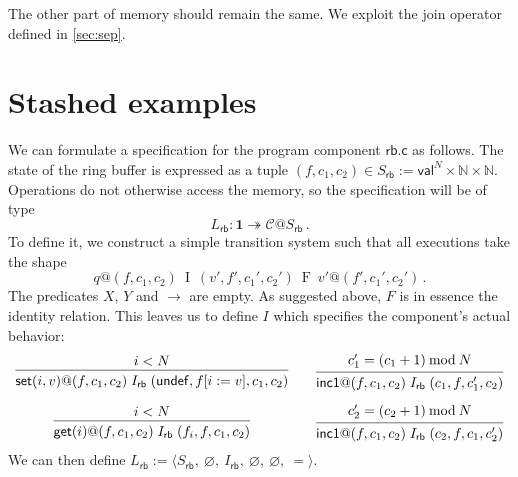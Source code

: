 \documentclass[acmsmall,screen,review,anonymous]{acmart}
\newcommand{\kw}[1]{\ensuremath{ \mathsf{#1} }}
\begin{document}
The other part of memory should remain the same.
We exploit the join operator defined in \ref{sec:sep}.

\section{Stashed examples}

\begin{example} \label{ex:rbspec} %
We can formulate a specification for
the program component $\kw{rb.c}$ as follows.
The state of the ring buffer
is expressed as a tuple
$(f, c_1, c_2) \in S_\kw{rb} := \kw{val}^N \times \mathbb{N} \times \mathbb{N}$.
Operations do not otherwise access the memory,
so the specification will be of type
\[
  L_\kw{rb} : \mathbf{1} \twoheadrightarrow \mathcal{C}@S_\kw{rb}
  \,.
\]
To define it, we construct a simple transition system such that
all executions take the shape
\[
  q@(f, c_1, c_2) \:\mathrel{I}\: (v', f', c_1', c_2')
                  \:\mathrel{F}\: v'@(f', c_1', c_2')
  \,.
\]
The predicates $X$, $Y$ and $\rightarrow$ are empty.
As suggested above, $F$ is in essence the identity relation.
This leaves us to define $I$ which specifies the component's
actual behavior:
\[ \begin{array}{c@{\qquad}c}
 {\begin{prooftree}
    \hypo{i < N}
    \infer1{
      \kw{set}(i, v)@(f, c_1, c_2)
      \mathrel{I_\kw{rb}}
      (\kw{undef}, f[i := v], c_1, c_2)}
  \end{prooftree}}
  &
 {\begin{prooftree}
    \hypo{c_1' = (c_1 + 1) \mathbin{\mathrm{mod}} N}
    \infer1{
      \kw{inc1}@(f, c_1, c_2)
      \mathrel{I_\kw{rb}}
      (c_1, f, c_1', c_2)}
  \end{prooftree}}
  \vspace{1em}
  \\
 {\begin{prooftree}
    \hypo{i < N}
    \infer1{
      \kw{get}(i)@(f, c_1, c_2)
      \mathrel{I_\kw{rb}}
      (f_i, f, c_1, c_2)
    }
  \end{prooftree}}
  &
 {\begin{prooftree}
    \hypo{c_2' = (c_2 + 1) \mathbin{\mathrm{mod}} N}
    \infer1{
      \kw{inc1}@(f, c_1, c_2)
      \mathrel{I_\kw{rb}}
      (c_2, f, c_1, c_2')}
  \end{prooftree}}
\end{array} \]
We can then define
$L_\kw{rb} := \langle
  S_\kw{rb},\:
  \varnothing,\:
  I_\kw{rb},\:
  \varnothing,\:
  \varnothing,\:
  {=}
 \rangle$.


\end{example}
\end{document}
